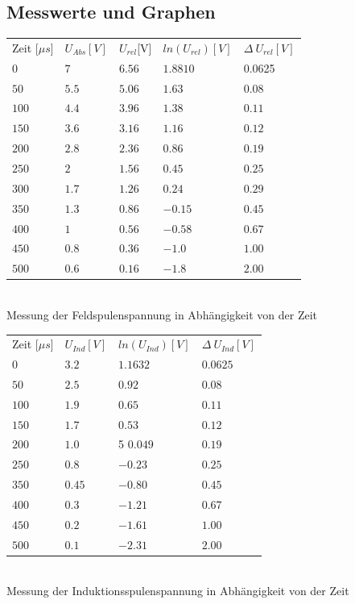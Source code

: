 \documentclass{article}
\begin{document}
\subsection{Messwerte und Graphen}
\begin{center}

\begin{tabular}{l l l l l}
Zeit [\(\mu s\)] & \(U_{Abs}[V]\) & \(U_{rel}\)[V] & \(ln(U_{rel})[V]\) & \(\Delta\ U_{rel}[V]\) \\
\(0\) & \(7\)	& \(6.56\) &	\(1.8810\) & 0.0625\\
\(50\) & \(5.5\) &	\(5.06\) &	\(1.63\) &  0.08 \\
\(100\) &	\(4.4\) &	\(3.96\) &	\(1.38\) &  \(0.11\)\\
\(150\) &	\(3.6\) &	\(3.16\) &	\(1.16\) & \(0.12\)\\
\(200\) &	\(2.8\) &	\(2.36\) &	\(0.86\) & \(0.19\)\\
\(250\) &	\(2\) &	\(1.56\) &	\(0.45\) & \(0.25\) \\
\(300\) &	\(1.7\) &	\(1.26\) &	\(0.24\) & \(0.29\) \\
\(350\) &	\(1.3\) &	\(0.86\) &	\(-0.15\) & \(0.45\) \\
\(400\) &	\(1\) &	\(0.56\) &	\(-0.58\) & \(0.67\) \\
\(450\) &	\(0.8\) &	\(0.36\) &	\(-1.0\) & \(1.00\) \\
\(500\) &	\(0.6\) &	\(0.16\) &	\(-1.8\) & \(2.00\) \\
\end{tabular}\\

Messung der Feldspulenspannung in Abhängigkeit von der Zeit\\
\vspace{1cm}
\begin{tabular}{l l l l}
Zeit [\(\mu s\)] & \(U_{Ind}[V]\) & \(ln(U_{Ind})[V]\) & \(\Delta\ U_{Ind}[V]\) \\
\(0\) &	\(3.2\) &	\(1.1632\) &	\(0.0625\)\\
\(50\) &	\(2.5\) &	\(0.92\) &	\(0.08\)\\
\(100\) &	\(1.9\) &	\(0.65\) &	\(0.11\)\\
\(150\) &	\(1.7\) &	\(0.53\) &	\(0.12\)\\
\(200\) &	\(1.0\) &5	\(0.049\) &	\(0.19\)\\
\(250\) &	\(0.8\) &	\(-0.23\) &	\(0.25\)\\
\(350\) &	\(0.45\) &	\(-0.80\) &	\(0.45\)\\
\(400\) &	\(0.3\) &	\(-1.21\) &	\(0.67\)\\
\(450\) &	\(0.2\) &	\(-1.61\) &	\(1.00\)\\
\(500\) &	\(0.1\) &	\(-2.31\) &	\(2.00\)\\

\end{tabular}\\
Messung der Induktionsspulenspannung in Abhängigkeit von der Zeit\\
\end{center}
\end{document}
